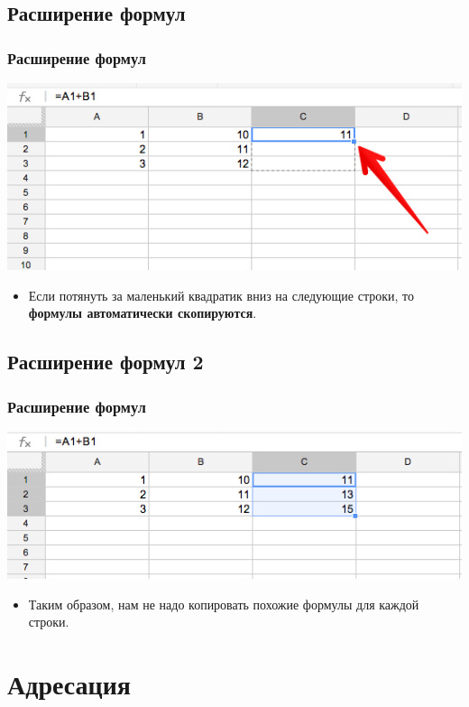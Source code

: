 \documentclass[compress,red]{beamer}
\begin{document}
\subsection{Расширение формул}
\begin{frame}[fragile]
  \frametitle{Расширение формул}
  \centerline{\includegraphics[width=1.0\textwidth]{images/08.png}}
  \begin{itemize}
    \item Если потянуть за маленький квадратик вниз на следующие строки, то \textbf{формулы автоматически скопируются}.
  \end{itemize}
\end{frame}

\subsection{Расширение формул 2}
\begin{frame}[fragile]
  \frametitle{Расширение формул}
  \centerline{\includegraphics[width=1.0\textwidth]{images/09.png}}
  \begin{itemize}
    \item Таким образом, нам не надо копировать похожие формулы для каждой строки.
  \end{itemize}
\end{frame}

\section{Адресация}
\end{document}
